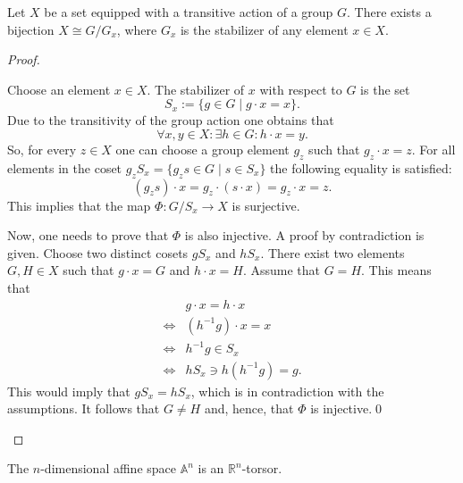     \begin{property}\label{group:transitive_action_property}
        Let $X$ be a set equipped with a transitive action of a group $G$. There exists a bijection $X\cong G/G_x$, where $G_x$ is the stabilizer of any element $x\in X$.\\
        \begin{proof}
            \begin{mdframed}[roundcorner=10pt, linecolor=blue, linewidth=1pt]
                Choose an element $x\in X$. The stabilizer of $x$ with respect to $G$ is the set \[S_x := \{g\in G\mid g\cdot x = x\}.\] Due to the transitivity of the group action one obtains that \[\forall x, y\in X: \exists h\in G: h\cdot x = y.\] So, for every $z\in X$ one can choose a group element $g_z$ such that $g_z\cdot x = z$. For all elements in the coset $g_zS_x = \{g_zs\in G\mid s\in S_x\}$ the following equality is satisfied: \[(g_zs)\cdot x = g_z\cdot (s\cdot x) = g_z\cdot x = z.\] This implies that the map $\Phi:G/S_x \rightarrow X$ is surjective.

                Now, one needs to prove that $\Phi$ is also injective. A proof by contradiction is given. Choose two distinct cosets $gS_x$ and $hS_x$. There exist two elements $G,H\in X$ such that $g\cdot x = G$ and $h\cdot x = H$. Assume that $G = H$. This means that
                \begin{align*}
                    &g\cdot x = h\cdot x\\
                    \iff&(h^{-1}g)\cdot x = x\\
                    \iff&h^{-1}g\in S_x\\
                    \iff&hS_x\ni h(h^{-1}g) = g.
                \end{align*}
                This would imply that $gS_x = hS_x$, which is in contradiction with the assumptions. It follows that $G\neq H$ and, hence, that $\Phi$ is injective.\qed
            \end{mdframed}
        \end{proof}
    \end{property}

    \begin{example}
        The $n$-dimensional affine space $\mathbb{A}^n$ is an $\mathbb{R}^n$-torsor.
    \end{example}

